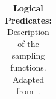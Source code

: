 \begin{table}[!t]
\begin{center}
{\begin{tabular}{ | m{} | m{} | }
\hline
\end{tabular}
}
\vspace{3pt}
\caption{\textbf{Logical Predicates:} Description of the sampling functions. Adapted from~\cite{li2021ig2}.}
\label{table:obj_pred_sampling}
\end{center}
\end{table}